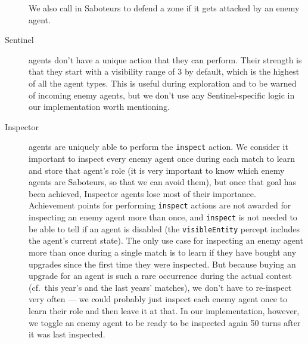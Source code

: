 \begin{description}
        We also call in Saboteurs to defend a zone if it gets attacked by an enemy agent.
    \item[Sentinel] agents don't have a unique action that they can perform.
        Their strength is that they start with a visibility range of 3 by default, which is the highest of all the agent types.
        This is useful during exploration and to be warned of incoming enemy agents, but we don't use any Sentinel-specific logic in our implementation worth mentioning.
    \item[Inspector] agents are uniquely able to perform the \texttt{inspect} action.
        We consider it important to inspect every enemy agent once during each match to learn and store that agent's role (it is very important to know which enemy agents are Saboteurs, so that we can avoid them), but once that goal has been achieved, Inspector agents lose most of their importance.
        Achievement points for performing \texttt{inspect} actions are not awarded for inspecting an enemy agent more than once, and \texttt{inspect} is not needed to be able to tell if an agent is disabled (the \texttt{visibleEntity} percept includes the agent's current state).
        The only use case for inspecting an enemy agent more than once during a single match is to learn if they have bought any upgrades since the first time they were inspected.
        But because buying an upgrade for an agent is such a rare occurrence during the actual contest (cf.\ this year's and the last years' matches), we don't have to re-inspect very often --- we could probably just inspect each enemy agent once to learn their role and then leave it at that.
        In our implementation, however, we toggle an enemy agent to be ready to be inspected again 50 turns after it was last inspected.
\end{description}

